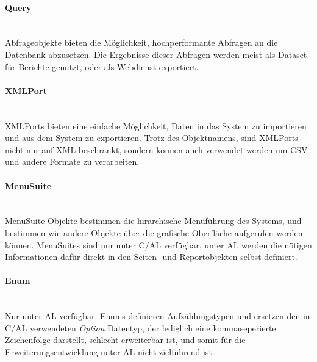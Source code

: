 \paragraph{Query} \mbox{}\\
Abfrageobjekte bieten die Möglichkeit, hochperformante Abfragen an die Datenbank abzusetzen. Die Ergebnisse dieser Abfragen werden meist als Dataset für Berichte genutzt, oder als Webdienst exportiert.

\paragraph{XMLPort}\mbox{}\\
XMLPorts bieten eine einfache Möglichkeit, Daten in das System zu importieren und aus dem System zu exportieren. Trotz des Objektnamens, sind XMLPorts nicht nur auf XML beschränkt, sondern können auch verwendet werden um CSV und andere Formate zu verarbeiten.

\paragraph{MenuSuite}\mbox{}\\
MenuSuite-Objekte bestimmen die hirarchische Menüführung des Systems, und bestimmen wie andere Objekte über die grafische Oberfläche aufgerufen werden können. MenuSuites sind nur unter C/AL verfügbar, unter AL werden die nötigen Informationen dafür direkt in den Seiten- und Reportobjekten selbst definiert.
\linebreak

\paragraph{Enum}\mbox{}\\
Nur unter AL verfügbar. Enums definieren Aufzählungstypen und ersetzen den in C/AL verwendeten \textit{Option} Datentyp, der lediglich eine kommaseperierte Zeichenfolge darstellt, schlecht erweiterbar ist, und somit für die Erweiterungsentwicklung unter AL nicht zielführend ist.





























